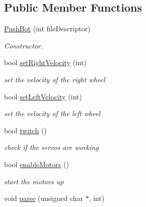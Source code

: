 \subsection*{Public Member Functions}
\begin{DoxyCompactItemize}
\item 
\hyperlink{class_push_bot_a9f01f2663700a2894c0cb52651ec7a8b}{Push\+Bot} (int file\+Descriptor)
\begin{DoxyCompactList}\small\item\em Constructor. \end{DoxyCompactList}\item 
\hypertarget{class_push_bot_a14e806fd8d5b1757440147099a393b2e}{}bool \hyperlink{class_push_bot_a14e806fd8d5b1757440147099a393b2e}{set\+Right\+Velocity} (int)\label{class_push_bot_a14e806fd8d5b1757440147099a393b2e}

\begin{DoxyCompactList}\small\item\em set the velocity of the right wheel \end{DoxyCompactList}\item 
\hypertarget{class_push_bot_aede73ab503b5732df67126a4322074f6}{}bool \hyperlink{class_push_bot_aede73ab503b5732df67126a4322074f6}{set\+Left\+Velocity} (int)\label{class_push_bot_aede73ab503b5732df67126a4322074f6}

\begin{DoxyCompactList}\small\item\em set the velocity of the left wheel \end{DoxyCompactList}\item 
\hypertarget{class_push_bot_aeac29d4529c93c2cabbfaab4a7358480}{}bool \hyperlink{class_push_bot_aeac29d4529c93c2cabbfaab4a7358480}{twitch} ()\label{class_push_bot_aeac29d4529c93c2cabbfaab4a7358480}

\begin{DoxyCompactList}\small\item\em check if the servos are working \end{DoxyCompactList}\item 
\hypertarget{class_push_bot_a55ab1fbdf79449dd45cc1d666da9e607}{}bool \hyperlink{class_push_bot_a55ab1fbdf79449dd45cc1d666da9e607}{enable\+Motors} ()\label{class_push_bot_a55ab1fbdf79449dd45cc1d666da9e607}

\begin{DoxyCompactList}\small\item\em start the motors up \end{DoxyCompactList}\item 
\hypertarget{class_push_bot_ae5ebe6028f68a35849a5d7802a1c154e}{}void \hyperlink{class_push_bot_ae5ebe6028f68a35849a5d7802a1c154e}{parse} (unsigned char $\ast$, int)\label{class_push_bot_ae5ebe6028f68a35849a5d7802a1c154e}


\end{DoxyCompactItemize}

